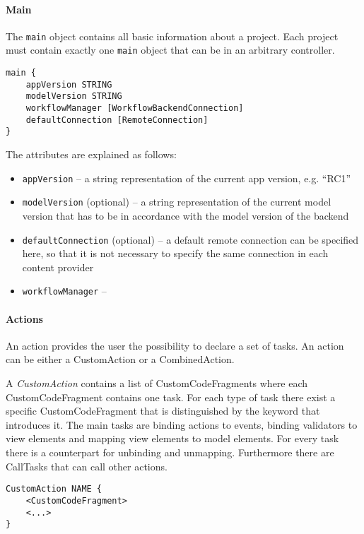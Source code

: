 
\paragraph{Main}
The \lstinline!main! object contains all basic information about a project. Each project must contain exactly one \lstinline!main! object that can be in an arbitrary controller.
\begin{lstlisting}
main {
	appVersion STRING
	modelVersion STRING
	workflowManager [WorkflowBackendConnection]
	defaultConnection [RemoteConnection]
}
\end{lstlisting}

The attributes are explained as follows:
\begin{itemize}
\item \lstinline!appVersion! -- a string representation of the current app version, e.g. \enquote{RC1}
\item  \lstinline!modelVersion! (optional) -- a string representation of the current model version that has to be in accordance with the model version of the backend
\item  \lstinline!defaultConnection! (optional) -- a default remote connection can be specified here, so that it is not necessary to specify the same connection in each content provider
\item \lstinline!workflowManager! -- 
\end{itemize}

\paragraph{Actions}
An action provides the user the possibility to declare a set of tasks. An action can be either a CustomAction or a CombinedAction.

A \textit{CustomAction} contains a list of CustomCodeFragments where each CustomCodeFragment contains one task. For each type of task there exist a specific CustomCodeFragment that is distinguished by the keyword that introduces it. The main tasks are binding actions to events, binding validators to view elements and mapping view elements to model elements. For every task there is a counterpart for unbinding and unmapping. Furthermore there are CallTasks that can call other actions.
\begin{lstlisting}
CustomAction NAME {
	<CustomCodeFragment>
	<...>
}
\end{lstlisting}


